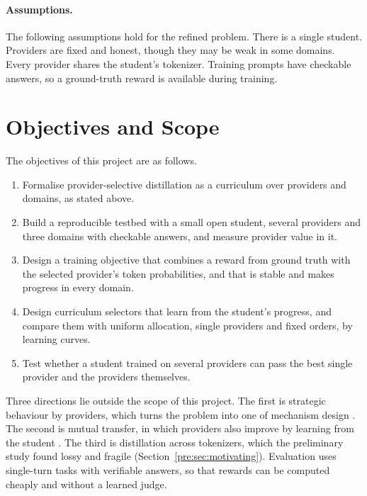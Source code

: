 \paragraph{Assumptions.} The following assumptions hold for the refined problem. There
is a single student. Providers are fixed and honest, though they may be weak in some
domains. Every provider shares the student's tokenizer. Training prompts have checkable
answers, so a ground-truth reward is available during training.

\section{Objectives and Scope}
\label{sec:Objectives}

The objectives of this project are as follows.

\begin{enumerate}[itemsep=2pt,topsep=4pt]
  \item Formalise provider-selective distillation as a curriculum over providers and
    domains, as stated above.
  \item Build a reproducible testbed with a small open student, several providers and
    three domains with checkable answers, and measure provider value in it.
  \item Design a training objective that combines a reward from ground truth with
    the selected provider's token probabilities, and that is stable and makes progress
    in every domain.
  \item Design curriculum selectors that learn from the student's progress, and
    compare them with uniform allocation, single providers and fixed orders, by
    learning curves.
  \item Test whether a student trained on several providers can pass the best single
    provider and the providers themselves.
\end{enumerate}

Three directions lie outside the scope of this project. The first is strategic
behaviour by providers, which turns the problem into one of mechanism design
\autocite{sim_cml_2020}. The second is mutual transfer, in which providers also improve
by learning from the student \autocite{fan_fedmkt_2025}. The third is distillation
across tokenizers, which the preliminary study found lossy and fragile
(Section~\ref{pre:sec:motivating}). Evaluation uses single-turn tasks with verifiable
answers, so that rewards can be computed cheaply and without a learned judge.

